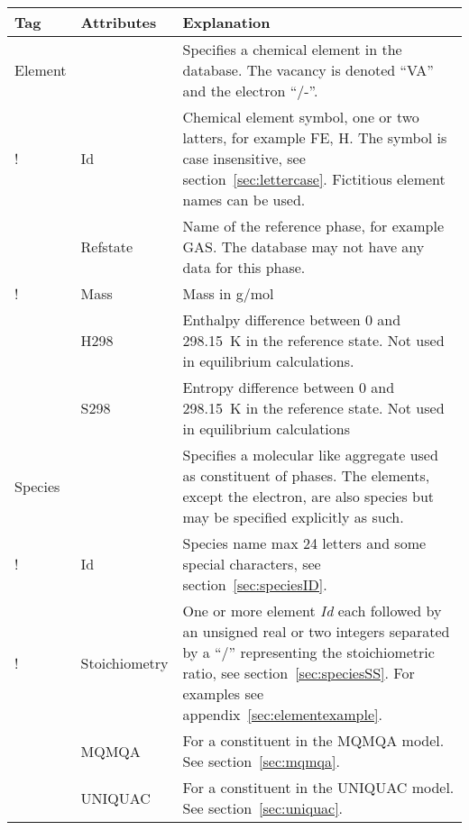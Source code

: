 \documentclass{article}
\begin{document}
\begin{tabular}{|p{} p{} p{}|}\hline
  Tag & Attributes & Explanation\\\hline

  Element & & Specifies a chemical element in the database.  The vacancy is denoted ``VA'' and the electron ``/-''.\\
!          & Id        &  Chemical element symbol, one or two latters, 
                         for example FE, H.  The symbol is case insensitive,
                         see section~\ref{sec:lettercase}.
                         Fictitious element names can be used. \\
          & Refstate  &  Name of the reference  phase, for example GAS.  The
                         database may not have any data for this phase. \\
!          & Mass      &  Mass in g/mol\\
          & H298      &  Enthalpy difference between 0 and 298.15~K 
                         in the reference state.  Not used in equilibrium
                         calculations. \\
          & S298      &  Entropy difference between 0 and 298.15~K in 
                         the reference state.  Not used in equilibrium
                         calculations\\\hline

  Species & & Specifies a molecular like aggregate used as constituent of phases.  The elements, except the electron, are also species but may be specified explicitly as such.\\
!          & Id        & Species name max 24 letters and some special
                         characters, see section~\ref{sec:speciesID}.\\
!          & Stoichiometry & One or more element {\em Id} each followed by 
                        an unsigned real or two integers separated by a ``/'' 
                        representing the stoichiometric ratio,
                        see section~\ref{sec:speciesSS}.  For examples see
                        appendix~\ref{sec:elementexample}.\\
          & MQMQA     & For a constituent in the MQMQA model.  See 
                        section~\ref{sec:mqmqa}.\\
          & UNIQUAC   & For a constituent in the UNIQUAC model. See 
                        section~\ref{sec:uniquac}.\\\hline

\end{tabular}
\end{document}
